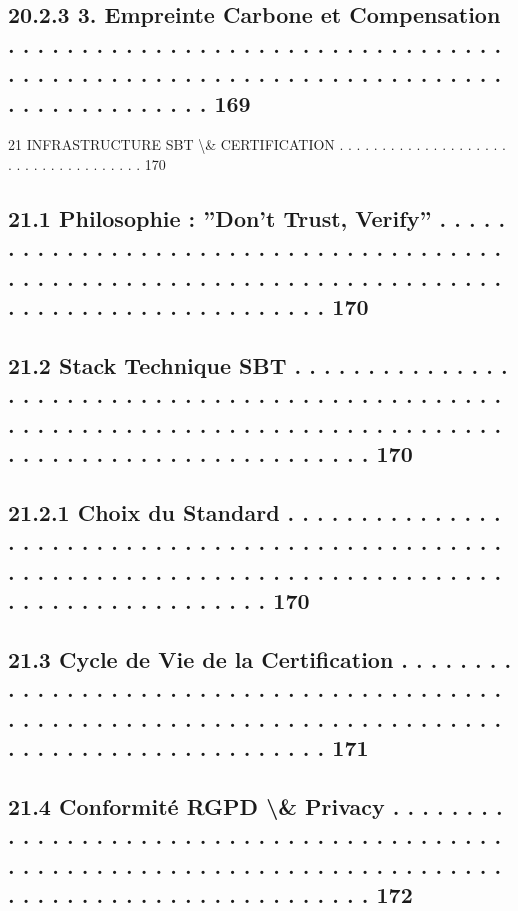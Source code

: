 \subsection{20.2.3             3. Empreinte Carbone et Compensation . . . . . . . . . . . . . . . . . . . . . . . . . . . . . . . . . . . . . . . . . . . . . . . . . . . . . . . . . . . . . . . . . . . . . . . . . . . . . . . . . . 169}
\vspace{0.5em}
21    INFRASTRUCTURE SBT \textbackslash{}& CERTIFICATION . . . . . . . . . . . . . . . . . . . . . . . . . . . . . . . . . . . . 170\\
\subsection{21.1    Philosophie : ”Don’t Trust, Verify” . . . . . . . . . . . . . . . . . . . . . . . . . . . . . . . . . . . . . . . . . . . . . . . . . . . . . . . . . . . . . . . . . . . . . . . . . . . . . . . . . . . . . . . . . . . . . . . 170}
\subsection{21.2    Stack Technique SBT . . . . . . . . . . . . . . . . . . . . . . . . . . . . . . . . . . . . . . . . . . . . . . . . . . . . . . . . . . . . . . . . . . . . . . . . . . . . . . . . . . . . . . . . . . . . . . . . . . . . . . . . . . . . 170}
\subsection{21.2.1             Choix du Standard . . . . . . . . . . . . . . . . . . . . . . . . . . . . . . . . . . . . . . . . . . . . . . . . . . . . . . . . . . . . . . . . . . . . . . . . . . . . . . . . . . . . . . . . . . . . . . . . . . . . . 170}
\subsection{21.3    Cycle de Vie de la Certification . . . . . . . . . . . . . . . . . . . . . . . . . . . . . . . . . . . . . . . . . . . . . . . . . . . . . . . . . . . . . . . . . . . . . . . . . . . . . . . . . . . . . . . . . . . . . . . . . . 171}
\subsection{21.4    Conformité RGPD \textbackslash{}& Privacy . . . . . . . . . . . . . . . . . . . . . . . . . . . . . . . . . . . . . . . . . . . . . . . . . . . . . . . . . . . . . . . . . . . . . . . . . . . . . . . . . . . . . . . . . . . . . . . . . . . . . 172}
